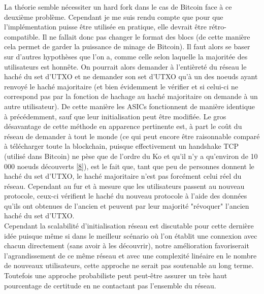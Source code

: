 \documentclass[12pt,a4paper]{article}
\newcommand{\source}[1]{\hyperlink{#1}{[#1]}}
\begin{document}
	La théorie semble nécessiter un hard fork dans le cas de Bitcoin face à ce deuxième problème. Cependant je me suis rendu compte que pour que l'implémentation puisse être utilisée en pratique, elle devrait être rétro-compatible. Il ne fallait donc pas changer le format des blocs (de cette manière cela permet de garder la puissance de minage de Bitcoin). Il faut alors se baser sur d'autres hypothèses que l'on a, comme celle selon laquelle la majoritée des utilisateurs est honnête. On pourrait alors demander à l'entièreté du réseau le haché du set d'UTXO et ne demander son set d'UTXO qu'à un des noeuds ayant renvoyé le haché majoritaire (et bien évidemment le vérifier et si celui-ci ne correspond pas par la fonction de hachage au haché majoritaire on demande à un autre utilisateur). De cette manière les ASICs fonctionnent de manière identique à précédemment, sauf que leur initialisation peut être modifiée. Le gros désavantage de cette méthode en apparence pertinente est, à part le coût du réseau de demander à tout le monde (ce qui peut encore être raisonnable comparé à télécharger toute la blockchain, puisque effectivement un handshake TCP (utilisé dans Bitcoin) ne pèse que de l'ordre du Ko et qu'il n'y a qu'environ de 10 000 noeuds découverts \source{8}), est le fait que, tant que peu de personnes donnent le haché du set d'UTXO, le haché majoritaire n'est pas forcément celui réel du réseau. Cependant au fur et à mesure que les utilisateurs passent au nouveau protocole, ceux-ci vérifient le haché du nouveau protocole à l'aide des données qu'ils ont obtenues de l'ancien et peuvent par leur majorité "révoquer" l'ancien haché du set d'UTXO.\\ %
	Cependant la scalabilité d'initialisation réseau est discutable pour cette dernière idée puisque même si dans le meilleur scénario où l'on établit une connexion avec chacun directement (sans avoir à les découvrir), notre amélioration favoriserait l'agrandissement de ce même réseau et avec une complexité linéaire en le nombre de nouveaux utilisateurs, cette approche ne serait pas soutenable au long terme. Toutefois une approche probabiliste peut peut-être assurer un très haut pourcentage de certitude en ne contactant pas l'ensemble du réseau.\\
\end{document}
